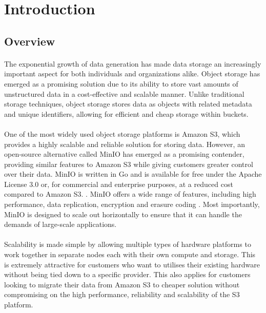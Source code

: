 \documentclass[12pt, conference, final, a4paper, onecolumn, compsoc]{IEEEtran}
\begin{document}
    \tableofcontents{}


    \section{Introduction}
    \subsection*{Overview}
    \paragraph{} %
    The exponential growth of data generation has made data storage an
    increasingly important aspect for both individuals and organizations alike.
    Object storage has emerged as a promising solution due to its ability to
    store vast amounts of unstructured data in a cost-effective and scalable
    manner. Unlike traditional storage techniques, object storage stores data as
    objects with related metadata and unique identifiers, allowing for efficient
    and cheap storage within buckets.


    \paragraph{} %
    One of the most widely used object storage platforms is Amazon S3, which
    provides a highly scalable and reliable solution for storing data. However,
    an open-source alternative called MinIO has emerged as a promising
    contender, providing similar features to Amazon S3 while giving customers
    greater control over their data. MinIO is written in Go and is available for
    free under the Apache License 3.0 or, for commercial and enterprise
    purposes, at a reduced cost compared to Amazon S3. \citep{minio-pricing}.
    MinIO offers a wide range of features, including high performance, data
    replication, encryption and erasure coding \citep{minio}. Most importantly,
    MinIO is designed to scale out horizontally to ensure that it can handle the
    demands of large-scale applications.

    \paragraph{} %
    Scalability is made simple by allowing multiple types of hardware platforms
    to work together in separate nodes each with their own compute and storage.
    This is extremely attractive for customers who want to utilises their
    existing hardware without being tied down to a specific provider. This also
    applies for customers looking to migrate their data from Amazon S3 to
    cheaper solution without compromising on the high performance, reliability
    and scalability of the S3 platform.
\end{document}
